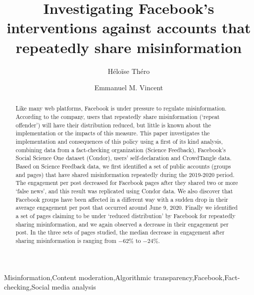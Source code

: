 \documentclass[review]{elsarticle}
\begin{document}
\begin{frontmatter}

\title{Investigating Facebook's interventions against accounts that repeatedly share misinformation}

\author[mymainaddress]{Héloïse Théro}

\author[mymainaddress]{Emmanuel M. Vincent}

\address[mymainaddress]{médialab - Sciences Po, Paris, France}

\begin{abstract}

Like many web platforms, Facebook is under pressure to regulate misinformation.
According to the company, users that repeatedly share misinformation (`repeat offender') will have their distribution reduced, but little is known about the implementation or the impacts of this measure.
This paper investigates the implementation and consequences of this policy using a first of its kind analysis, combining data from a fact-checking organization (Science Feedback), Facebook’s Social Science One dataset (Condor), users’ self-declaration and CrowdTangle data. 
Based on Science Feedback data, we first identified a set of public accounts (groups and pages) that have shared misinformation repeatedly during the 2019-2020 period.
The engagement per post decreased for Facebook pages after they shared two or more `false news’, and this result was replicated using Condor data.
We also discover that Facebook groups have been affected in a different way with a sudden drop in their average engagement per post that occurred around June 9, 2020.
Finally we identified a set of pages claiming to be under `reduced distribution' by Facebook for repeatedly sharing misinformation, and we again observed a decrease in their engagement per post.
In the three sets of pages studied, the median decrease in engagement after sharing misinformation is ranging from $-62\%$ to $-24\%$.

\end{abstract}

\begin{keyword}
Misinformation\sep Content moderation\sep Algorithmic transparency\sep Facebook\sep Fact-checking\sep Social media analysis
\end{keyword}

\end{frontmatter}
\end{document}
